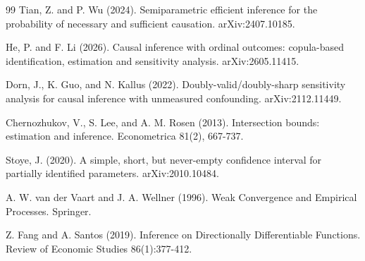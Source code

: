 \documentclass{article}
\begin{document}
\begin{thebibliography}{99}
   Tian, Z. and P. Wu (2024). Semiparametric efficient inference for the probability of necessary and sufficient causation. arXiv:2407.10185.

   He, P. and F. Li (2026). Causal inference with ordinal outcomes: copula-based identification, estimation and sensitivity analysis. arXiv:2605.11415.

   Dorn, J., K. Guo, and N. Kallus (2022). Doubly-valid/doubly-sharp sensitivity analysis for causal inference with unmeasured confounding. arXiv:2112.11449.

   Chernozhukov, V., S. Lee, and A. M. Rosen (2013). Intersection bounds: estimation and inference. Econometrica 81(2), 667-737.

   Stoye, J. (2020). A simple, short, but never-empty confidence interval for partially identified parameters. arXiv:2010.10484.

   A. W. van der Vaart and J. A. Wellner (1996). Weak Convergence and Empirical Processes. Springer.

   Z. Fang and A. Santos (2019). Inference on Directionally Differentiable Functions. Review of Economic Studies 86(1):377-412.

\end{thebibliography}
\end{document}
